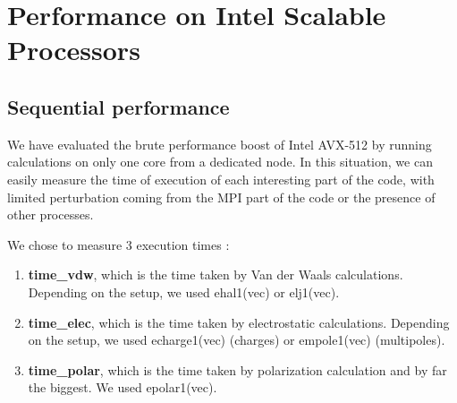 \documentclass[9pt,comparison]{livecoms}
\begin{document}
\section{Performance on Intel Scalable Processors}

\subsection{Sequential performance}
\hspace{\parindent}We have evaluated the brute performance boost of Intel AVX-512 by running calculations on only one core from a dedicated node. In this situation, we can easily measure the time of execution of each interesting part of the code, with limited perturbation coming from the MPI part of the code or the presence of other processes.

We chose to measure 3 execution times :
\begin{enumerate}
    \item \textbf{time\_vdw}, which is the time taken by Van der Waals calculations. Depending on the setup, we used  {\color{codepurple} ehal1(vec)} or {\color{codepurple} elj1(vec)}.
    \item \textbf{time\_elec}, which is the time taken by electrostatic calculations. Depending on the setup, we used {\color{codepurple}echarge1(vec)} (charges) or {\color{codepurple}empole1(vec)} (multipoles).
    \item \textbf{time\_polar}, which is the time taken by polarization calculation and by far the biggest. We used {\color{codepurple} epolar1(vec)}.
\end{enumerate}
\end{document}
